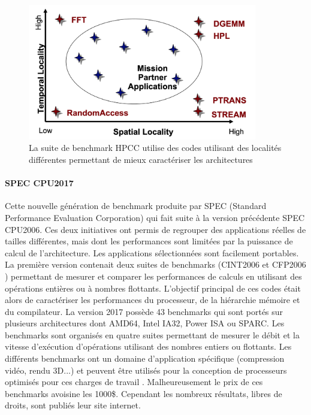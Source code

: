             \begin{figure}
                \center
                \includegraphics[width=10cm]{images/bench_hpcc.png}
                \caption{ La suite de benchmark HPCC utilise des codes utilisant des localités différentes permettant de mieux caractériser les architectures
                \label{pic_bench_hpcc}}
            \end{figure}
        
        
        \paragraph{SPEC CPU2017 \cite{Bucek2018}} 
        
            Cette nouvelle génération de benchmark produite par SPEC (Standard Performance Evaluation Corporation) qui fait suite à la version précédente SPEC CPU2006. Ces deux initiatives ont permis de regrouper des applications réelles de tailles différentes, mais dont les performances sont limitées par la puissance de calcul de l'architecture. Les applications sélectionnées sont facilement portables. La première version contenait deux suites de benchmarks (CINT2006 \cite{Dilipbhai2012} et CFP2006 \cite{Sharkawi2009}) permettant de mesurer et comparer les performances de calculs en utilisant des opérations entières ou à nombres flottants. L'objectif principal de ces codes était alors de caractériser les performances du processeur, de la hiérarchie mémoire et du compilateur. La version 2017 possède 43 benchmarks qui sont portés sur plusieurs architectures dont AMD64, Intel IA32, Power ISA ou SPARC. Les benchmarks sont organisés en quatre suites permettant de mesurer le débit et la vitesse d'exécution d'opérations utilisant des nombres entiers ou flottants.  Les différents benchmarks ont un domaine d'application spécifique (compression vidéo, rendu 3D...) et peuvent être utilisés pour la conception de processeurs optimisés pour ces charges de travail \cite{Panda2018}. Malheureusement le prix de ces benchmarks avoisine les 1000\$. Cependant les nombreux résultats, libres de droits, sont publiés leur site internet. 
        
